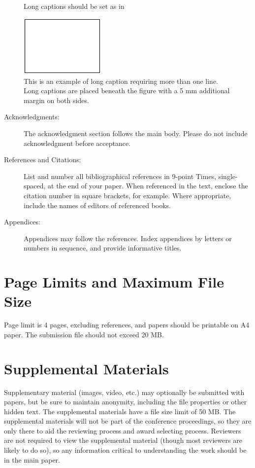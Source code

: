 \documentclass{mva_style}
\begin{document}
\begin{figure}[t]
\noindent
Long captions should be set as in
  \begin{center}
    \includegraphics[height=30mm]{fig2.eps}
  \end{center}
  \caption{
    This is an example of long caption requiring more than one line. 
    Long captions are placed beneath the figure with a 5 mm 
    additional margin on both sides.
  }
  \label{sample-figure2}
\end{figure}


\begin{description}

\item[Acknowledgments:]
  The acknowledgment section follows the main body. Please do not include acknowledgment before acceptance.
  
\item[References and Citations:]
  List and number all bibliographical references 
  in 9-point Times, single-spaced, at the end of your paper.
  When referenced in the text, enclose the citation number 
  in square brackets, for example\cite{IMR}. 
  Where appropriate, include the names of editors of referenced books.
  
\item[Appendices:]
  Appendices may follow the references. 
  Index appendices by letters or numbers in sequence, 
  and provide informative titles.

\end{description}


\balance

\section{Page Limits and Maximum File Size}
Page limit is 4 pages, excluding references, and papers should be printable on A4 paper. The submission file should not exceed 20 MB.


\section{Supplemental Materials}
Supplementary material (images, video, etc.) may optionally be submitted with
papers, but be sure to maintain anonymity, including the file properties or
other hidden text. The supplemental materials have a file size limit of 50
MB. The supplemental materials will not be part of the conference proceedings,
so they are only there to aid the reviewing process and award selecting
process. Reviewers are not required to view the supplemental material (though
most reviewers are likely to do so), so any information critical to
understanding the work should be in the main paper.
\end{document}
